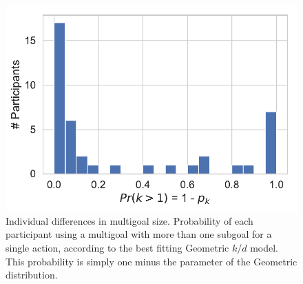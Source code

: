 \documentclass[10pt,letterpaper]{article}
\newcommand{\todo}[1]{\textcolor{red}{\textsc{[TODO: #1]}}}
\begin{document}


\begin{figure}[ht]
    \centering
    \includegraphics[scale=0.55]{geom-k-p}
    \caption{Individual differences in multigoal size. Probability of each participant using a multigoal with more than one subgoal for a single action, according to the best fitting Geometric $k$/$d$ model. This probability is simply one minus the parameter of the Geometric distribution.}
    \label{fig:p_k}
\end{figure}


\end{document}
